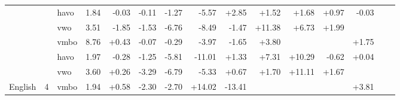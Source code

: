 \begin{tabular}{lllrrrrrrrrrrrr}
 &  & havo & 1.84 & -0.03 & -0.11 & -1.27 & -5.57 & +2.85 & +1.52 & +1.68 & +0.97 & -0.03 &  & \\

 & \multirow[t]{-3}{*}{\raggedright\arraybackslash 2} & vwo & 3.51 & -1.85 & -1.53 & -6.76 & -8.49 & -1.47 & +11.38 & +6.73 & +1.99 &  &  & \\

 &  & vmbo & 8.76 & +0.43 & -0.07 & -0.29 & -3.97 & -1.65 & +3.80 &  &  & +1.75 &  & \\

 &  & havo & 1.97 & -0.28 & -1.25 & -5.81 & -11.01 & +1.33 & +7.31 & +10.29 & -0.62 & +0.04 &  & \\

 & \multirow[t]{-3}{*}{\raggedright\arraybackslash 3} & vwo & 3.60 & +0.26 & -3.29 & -6.79 & -5.33 & +0.67 & +1.70 & +11.11 & +1.67 &  &  & \\

\multirow[t]{-10}{*}{\raggedright\arraybackslash English} & 4 & vmbo & 1.94 & +0.58 & -2.30 & -2.70 & +14.02 & -13.41 &  &  &  & +3.81 &  & \\
\bottomrule
\end{tabular}